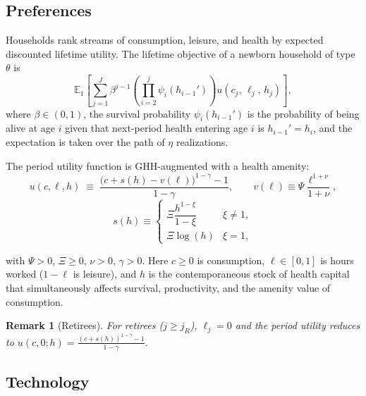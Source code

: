 \documentclass[12pt,a4paper]{article}
\newcommand{\E}{\mathbb{E}}
\newtheorem{remark}{Remark}
\begin{document}
\subsection{Preferences}
\label{subsec:preferences}

Households rank streams of consumption, leisure, and health by expected discounted lifetime utility. The lifetime objective of a newborn household of type~$\theta$ is
\begin{equation}
\label{eq:lifetime_utility}
\E_1 \left[\sum_{j=1}^{J} \beta^{j-1} \left(\prod_{i=2}^{j} \psi_i(h_{i-1}')\right) u(c_j,\, \ell_j,\, h_j)\right],
\end{equation}
where $\beta \in (0,1)$, the survival probability $\psi_i(h_{i-1}')$ is the probability of being alive at age $i$ given that next-period health entering age $i$ is $h_{i-1}' = h_i$, and the expectation is taken over the path of $\eta$ realizations.
 
The period utility function is GHH-augmented with a health amenity:
\begin{equation}
\label{eq:utility}
u(c, \ell, h) \;\equiv\; \frac{\bigl(c + s(h) - v(\ell)\bigr)^{1-\gamma} - 1}{1 - \gamma},
\qquad
v(\ell) \equiv \Psi \frac{\ell^{1+\nu}}{1+\nu},
\end{equation}
\begin{equation}
    s(h) \equiv
\begin{cases}
\Xi \dfrac{h^{1-\xi}}{1-\xi} & \xi \neq 1,\\[6pt]
\Xi \log(h) & \xi = 1,
\end{cases}
\end{equation}

with $\Psi > 0$, $\Xi \geq 0$, $\nu > 0$, $\gamma > 0$. Here $c \geq 0$ is consumption, $\ell \in [0, 1]$ is hours worked ($1-\ell$ is leisure), and $h$ is the contemporaneous stock of health capital that simultaneously affects survival, productivity, and the amenity value of consumption.

\begin{remark}[Retirees]
\label{rem:retirees}
For retirees ($j \geq j_R$), $\ell_j = 0$ and the period utility reduces to $u(c, 0; h) = \frac{(c + s(h))^{1-\gamma} - 1}{1-\gamma}$.
\end{remark}


\subsection{Technology}
\label{subsec:technology}
\end{document}
